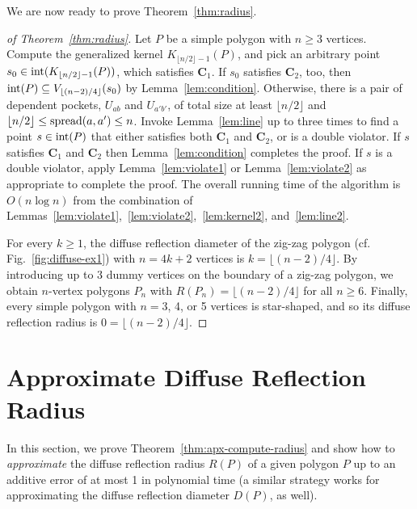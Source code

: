 \documentclass[12pt]{article}
\newcommand{\floor}[1]{{\lfloor #1 \rfloor}}
\begin{document}
We are now ready to prove Theorem~\ref{thm:radius}.
\begin{proof}[of Theorem~\ref{thm:radius}]
Let $P$ be a simple polygon with $n \geq 3$ vertices.
Compute the generalized kernel $K_{\floor{n/2}-1}(P)$,
and pick an arbitrary point $s_0\in {\rm int}(K_{\floor{n/2}-1}(P))$,
which satisfies $\mathbf{C}_1$. If $s_0$ satisfies $\mathbf{C}_2$, too,
then ${\rm int}(P)\subseteq V_\floor{(n-2)/4}(s_0)$ by Lemma~\ref{lem:condition}.
Otherwise, there is a pair of dependent pockets, $U_{ab}$ and $U_{a'b'}$,
of total size at least $\floor{n/2}$ and $\floor{n/2}\leq {\rm spread}(a,a')\leq n$.
Invoke Lemma~\ref{lem:line} up to three times to find a point $s\in {\rm int}(P)$
that either satisfies both $\mathbf{C}_1$ and $\mathbf{C}_2$, or is a double violator.
If $s$ satisfies $\mathbf{C}_1$ and $\mathbf{C}_2$ then Lemma~\ref{lem:condition}
completes the proof. If $s$ is a double violator, apply Lemma~\ref{lem:violate1} or Lemma~\ref{lem:violate2} as appropriate to complete the proof. The overall running time
of the algorithm is $O(n\log n)$ from the combination of Lemmas~\ref{lem:violate1},~\ref{lem:violate2},~\ref{lem:kernel2}, and~\ref{lem:line2}.

For every $k\geq 1$, the diffuse reflection diameter of the zig-zag polygon (cf. Fig.~\ref{fig:diffuse-ex1}) with $n=4k+2$ vertices is $k=\floor{(n-2)/4}$. By introducing up to 3 dummy vertices on the boundary of a zig-zag polygon, we obtain $n$-vertex polygons $P_n$ with $R(P_n)=\floor{(n-2)/4}$ for all $n\geq 6$. Finally, every simple polygon with $n=3$, 4, or 5 vertices is star-shaped, and so its diffuse reflection radius is $0=\floor{(n-2)/4}$.
\end{proof}

\section{Approximate Diffuse Reflection Radius}

In this section, we prove Theorem~\ref{thm:apx-compute-radius} and show how to \emph{approximate} the diffuse reflection radius $R(P)$ of a given polygon $P$ up to an additive error of at most 1 in polynomial time (a similar strategy works for approximating the diffuse reflection diameter $D(P)$, as well).
\end{document}
